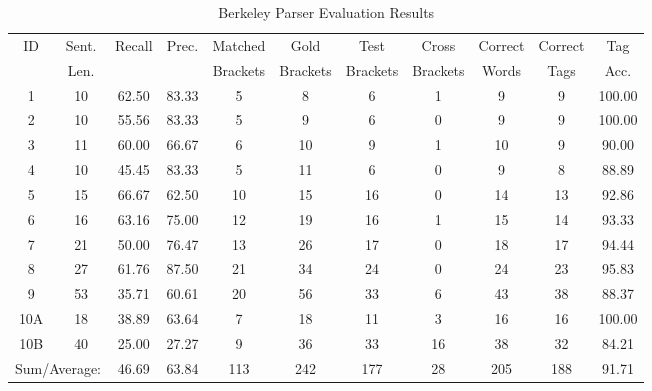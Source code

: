 \begin{table*}[htbp!]
\centering
\begin{tabular}{@{}ccccccccccc@{}}
\toprule
ID & Sent. & Recall & Prec. & Matched & Gold & Test & Cross & Correct & Correct & Tag \\
 & Len. & & & Brackets & Brackets & Brackets & Brackets & Words & Tags & Acc. \\
\midrule
1 & 10 & 62.50 & 83.33 & 5 & 8 & 6 & 1 & 9 & 9 & 100.00 \\
2 & 10 & 55.56 & 83.33 & 5 & 9 & 6 & 0 & 9 & 9 & 100.00 \\
3 & 11 & 60.00 & 66.67 & 6 & 10 & 9 & 1 & 10 & 9 & 90.00 \\
4 & 10 & 45.45 & 83.33 & 5 & 11 & 6 & 0 & 9 & 8 & 88.89 \\
5 & 15 & 66.67 & 62.50 & 10 & 15 & 16 & 0 & 14 & 13 & 92.86 \\
6 & 16 & 63.16 & 75.00 & 12 & 19 & 16 & 1 & 15 & 14 & 93.33 \\
7 & 21 & 50.00 & 76.47 & 13 & 26 & 17 & 0 & 18 & 17 & 94.44 \\
8 & 27 & 61.76 & 87.50 & 21 & 34 & 24 & 0 & 24 & 23 & 95.83 \\
9 & 53 & 35.71 & 60.61 & 20 & 56 & 33 & 6 & 43 & 38 & 88.37 \\
10A & 18 & 38.89 & 63.64 & 7 & 18 & 11 & 3 & 16 & 16 & 100.00 \\
10B & 40 & 25.00 & 27.27 & 9 & 36 & 33 & 16 & 38 & 32 & 84.21 \\
\midrule
\multicolumn{2}{l}{Sum/Average:} & 46.69 & 63.84 & 113 & 242 & 177 & 28 & 205 & 188 & 91.71 \\
\bottomrule
\end{tabular}
\caption{Berkeley Parser Evaluation Results}
\label{{tab:parser_eval}}
\end{table*}
